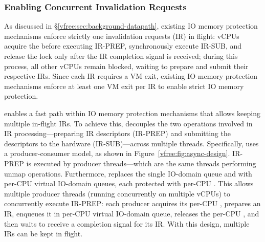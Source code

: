 
    



\subsubsection{Enabling Concurrent Invalidation Requests}
\label{vfree:ssec:enabling}
As discussed in \S\ref{vfree:sec:background-datapath}, 
    existing IO memory protection mechanisms 
    enforce strictly one invalidation requests (IR) in flight: 
    vCPUs acquire the  before executing IR-PREP, 
    synchronously execute IR-SUB, and release the lock only after the IR completion signal is received; 
    during this process, all other vCPUs remain blocked, waiting to prepare and submit their respective IRs. 
Since each IR requires a VM exit, existing IO memory protection mechanisms 
    enforce at least one VM exit per IR to enable strict IO memory protection.

{\vfreename} enables a fast path within IO memory protection mechanisms that 
    allows keeping multiple in-flight IRs. 
To achieve this, {\vfreename} decouples the two operations involved in IR processing---preparing 
    IR descriptors (IR-PREP) and submitting the descriptors to the hardware (IR-SUB)---across multiple threads. 
Specifically, {\vfreename} uses a producer-consumer model, as shown in Figure~\ref{vfree:fig:async-design}. 
IR-PREP is executed by producer threads---which are the same threads performing unmap operations. 
Furthermore, {\vfreename} replaces the single IO-domain queue and  
    with per-CPU virtual IO-domain queues, each protected with per-CPU . 
This allows multiple producer threads (running concurrently on multiple vCPUs) 
    to concurrently execute IR-PREP: 
    each producer acquires its per-CPU , 
    prepares an IR, enqueues it in per-CPU virtual IO-domain queue, releases the per-CPU , and then waits to receive a completion signal for its IR. 
With this design, multiple IRs can be kept in flight. %

